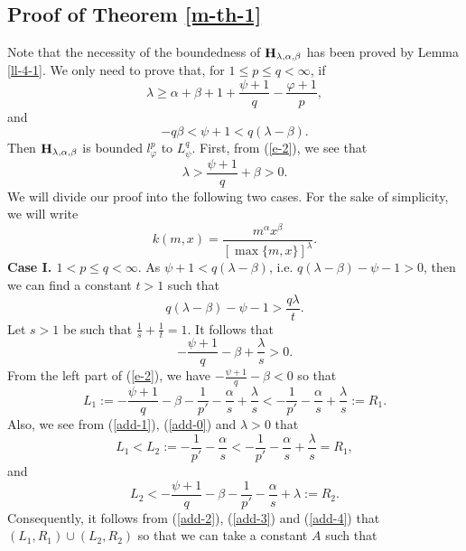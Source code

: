 \documentclass[10pt]{amsart}
\theoremstyle{definition}    %
\numberwithin{equation}{section}
\begin{document}
\subsection{{\bf Proof of Theorem \ref{m-th-1} }}Note that the necessity of the boundedness of ${\bf H}_{\lambda, \alpha, \beta}$ has been proved by Lemma \ref{ll-4-1}. We only need to prove that, for $1\leq p\leq q<\infty$, if 
\begin{equation}\label{e-1}\lambda\geq \alpha+\beta+1+\frac{\psi+1}{q}-\frac{\varphi+1}{p},\end{equation}
and
\begin{equation}\label{e-2}-q\beta<\psi+1<q(\lambda-\beta).\end{equation}
Then ${\bf H}_{\lambda, \alpha, \beta}$ is bounded $l_{\varphi}^{p}$ to $L_{\psi}^{q}$. First, from (\ref{e-2}), we see that  
\begin{equation}\label{e-3} \lambda> \frac{\psi+1}{q}+\beta >0.\end{equation}
We will divide our proof into the following two cases.
For the sake of simplicity, we will write
$$k(m,x)=\frac{m^{\alpha}x^{\beta}}{[\max\{m,x\}]^{\lambda}}.$$
{\bf Case I. $1<p\leq q<\infty.$} As $\psi+1<q(\lambda-\beta)$, i.e. $q(\lambda-\beta)-\psi-1>0$, then we can find a constant $t>1$ such that 
\begin{equation}\label{add-0}q(\lambda-\beta)-\psi-1>\frac{q\lambda}{t}.\end{equation} 
Let $s>1$ be such that $\frac{1}{s}+\frac{1}{t}=1$.  It follows that
\begin{equation}\label{add-1}-\frac{\psi+1}{q}-\beta+\frac{\lambda}{s}>0.\end{equation} From the left part of (\ref{e-2}), we have
$-\frac{\psi+1}{q}-\beta<0$ so that 
\begin{equation}\label{add-2}L_1:=-\frac{\psi+1}{q}-\beta-\frac{1}{p'}-\frac{\alpha}{s}+\frac{\lambda}{s}<-\frac{1}{p'}-\frac{\alpha}{s}+\frac{\lambda}{s}:=R_1.\end{equation}
Also, we see from (\ref{add-1}), (\ref{add-0}) and $\lambda>0$ that 
\begin{equation}\label{add-3}L_1<L_2:=-\frac{1}{p'}-\frac{\alpha}{s}<-\frac{1}{p'}-\frac{\alpha}{s}+\frac{\lambda}{s}=R_1,\end{equation}
and 
\begin{equation}\label{add-4} L_2<-\frac{\psi+1}{q}-\beta-\frac{1}{p'}-\frac{\alpha}{s}+\lambda:=R_2.\end{equation}
Consequently, it follows from (\ref{add-2}), (\ref{add-3}) and (\ref{add-4}) that $(L_1, R_1)\cup (L_2, R_2)$ so that we can take a constant $A$ such that 
\end{document}
